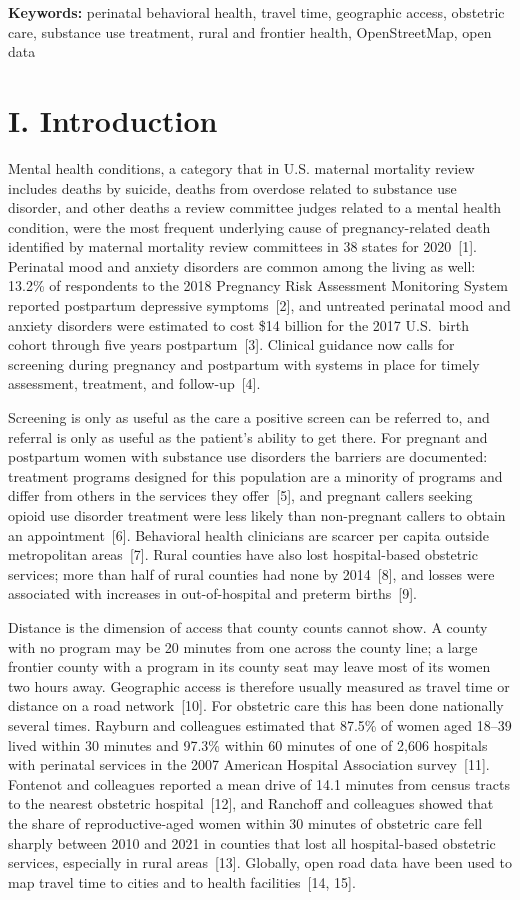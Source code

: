\documentclass{article}
\begin{document}
\textbf{Keywords:} perinatal behavioral health, travel time, geographic access, obstetric care, substance use treatment, rural and frontier health, OpenStreetMap, open data

\section*{I. Introduction}

Mental health conditions, a category that in U.S. maternal mortality review includes deaths by suicide, deaths from overdose related to substance use disorder, and other deaths a review committee judges related to a mental health condition, were the most frequent underlying cause of pregnancy-related death identified by maternal mortality review committees in 38 states for 2020~[1]. Perinatal mood and anxiety disorders are common among the living as well: 13.2\% of respondents to the 2018 Pregnancy Risk Assessment Monitoring System reported postpartum depressive symptoms~[2], and untreated perinatal mood and anxiety disorders were estimated to cost \$14 billion for the 2017 U.S.\ birth cohort through five years postpartum~[3]. Clinical guidance now calls for screening during pregnancy and postpartum with systems in place for timely assessment, treatment, and follow-up~[4].

Screening is only as useful as the care a positive screen can be referred to, and referral is only as useful as the patient's ability to get there. For pregnant and postpartum women with substance use disorders the barriers are documented: treatment programs designed for this population are a minority of programs and differ from others in the services they offer~[5], and pregnant callers seeking opioid use disorder treatment were less likely than non-pregnant callers to obtain an appointment~[6]. Behavioral health clinicians are scarcer per capita outside metropolitan areas~[7]. Rural counties have also lost hospital-based obstetric services; more than half of rural counties had none by 2014~[8], and losses were associated with increases in out-of-hospital and preterm births~[9].

Distance is the dimension of access that county counts cannot show. A county with no program may be 20 minutes from one across the county line; a large frontier county with a program in its county seat may leave most of its women two hours away. Geographic access is therefore usually measured as travel time or distance on a road network~[10]. For obstetric care this has been done nationally several times. Rayburn and colleagues estimated that 87.5\% of women aged 18--39 lived within 30 minutes and 97.3\% within 60 minutes of one of 2,606 hospitals with perinatal services in the 2007 American Hospital Association survey~[11]. Fontenot and colleagues reported a mean drive of 14.1 minutes from census tracts to the nearest obstetric hospital~[12], and Ranchoff and colleagues showed that the share of reproductive-aged women within 30 minutes of obstetric care fell sharply between 2010 and 2021 in counties that lost all hospital-based obstetric services, especially in rural areas~[13]. Globally, open road data have been used to map travel time to cities and to health facilities~[14, 15].
\end{document}
